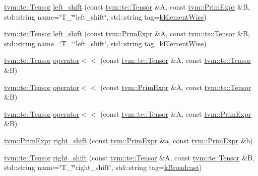 \begin{DoxyCompactItemize}
\item 
\hyperlink{classtvm_1_1te_1_1Tensor}{tvm\+::te\+::\+Tensor} \hyperlink{namespacetopi_ac3e5c6f24dc7909af275a0d2e5e6e6d2}{left\+\_\+shift} (const \hyperlink{classtvm_1_1te_1_1Tensor}{tvm\+::te\+::\+Tensor} \&A, const \hyperlink{classtvm_1_1PrimExpr}{tvm\+::\+Prim\+Expr} \&B, std\+::string name=\char`\"{}T\+\_\+\char`\"{}\char`\"{}left\+\_\+shift\char`\"{}, std\+::string tag=\hyperlink{namespacetopi_ac1b34ed59d38a5f5338bee6b2cad42be}{k\+Element\+Wise})
\item 
\hyperlink{classtvm_1_1te_1_1Tensor}{tvm\+::te\+::\+Tensor} \hyperlink{namespacetopi_a6fe04cd61879c2114ce70eaaf4caa07c}{left\+\_\+shift} (const \hyperlink{classtvm_1_1PrimExpr}{tvm\+::\+Prim\+Expr} \&A, const \hyperlink{classtvm_1_1te_1_1Tensor}{tvm\+::te\+::\+Tensor} \&B, std\+::string name=\char`\"{}T\+\_\+\char`\"{}\char`\"{}left\+\_\+shift\char`\"{}, std\+::string tag=\hyperlink{namespacetopi_ac1b34ed59d38a5f5338bee6b2cad42be}{k\+Element\+Wise})
\item 
\hyperlink{classtvm_1_1te_1_1Tensor}{tvm\+::te\+::\+Tensor} \hyperlink{namespacetopi_ad65b1595bb2397770a380e28b6a1f685}{operator$<$$<$} (const \hyperlink{classtvm_1_1te_1_1Tensor}{tvm\+::te\+::\+Tensor} \&A, const \hyperlink{classtvm_1_1te_1_1Tensor}{tvm\+::te\+::\+Tensor} \&B)
\item 
\hyperlink{classtvm_1_1te_1_1Tensor}{tvm\+::te\+::\+Tensor} \hyperlink{namespacetopi_ab9753026296c10c822825be2f6db7179}{operator$<$$<$} (const \hyperlink{classtvm_1_1PrimExpr}{tvm\+::\+Prim\+Expr} \&A, const \hyperlink{classtvm_1_1te_1_1Tensor}{tvm\+::te\+::\+Tensor} \&B)
\item 
\hyperlink{classtvm_1_1te_1_1Tensor}{tvm\+::te\+::\+Tensor} \hyperlink{namespacetopi_a17214322c35cdcc16af23a1d7d37c50c}{operator$<$$<$} (const \hyperlink{classtvm_1_1te_1_1Tensor}{tvm\+::te\+::\+Tensor} \&A, const \hyperlink{classtvm_1_1PrimExpr}{tvm\+::\+Prim\+Expr} \&B)
\item 
\hyperlink{classtvm_1_1PrimExpr}{tvm\+::\+Prim\+Expr} \hyperlink{namespacetopi_a14301866288307e63c2ab414e67f6be3}{right\+\_\+shift} (const \hyperlink{classtvm_1_1PrimExpr}{tvm\+::\+Prim\+Expr} \&a, const \hyperlink{classtvm_1_1PrimExpr}{tvm\+::\+Prim\+Expr} \&b)
\item 
\hyperlink{classtvm_1_1te_1_1Tensor}{tvm\+::te\+::\+Tensor} \hyperlink{namespacetopi_a5ed12e6692ff6d2fda9b3b4b4cd15d32}{right\+\_\+shift} (const \hyperlink{classtvm_1_1te_1_1Tensor}{tvm\+::te\+::\+Tensor} \&A, const \hyperlink{classtvm_1_1te_1_1Tensor}{tvm\+::te\+::\+Tensor} \&B, std\+::string name=\char`\"{}T\+\_\+\char`\"{}\char`\"{}right\+\_\+shift\char`\"{}, std\+::string tag=\hyperlink{namespacetopi_a794b9155e9ba9d1c9c42a1cff1fb645f}{k\+Broadcast})

\end{DoxyCompactItemize}
